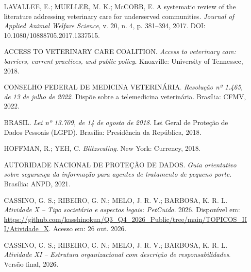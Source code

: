 \begin{enumerate}[label={[\arabic*]},leftmargin=1.1cm,itemsep=0.35em]
\item LAVALLEE, E.; MUELLER, M. K.; McCOBB, E. A systematic review of the literature addressing veterinary care for underserved communities. \textit{Journal of Applied Animal Welfare Science}, v. 20, n. 4, p. 381--394, 2017. DOI: 10.1080/10888705.2017.1337515.
\item ACCESS TO VETERINARY CARE COALITION. \textit{Access to veterinary care: barriers, current practices, and public policy}. Knoxville: University of Tennessee, 2018.
\item CONSELHO FEDERAL DE MEDICINA VETERINÁRIA. \textit{Resolução nº 1.465, de 13 de julho de 2022}. Dispõe sobre a telemedicina veterinária. Brasília: CFMV, 2022.
\item BRASIL. \textit{Lei nº 13.709, de 14 de agosto de 2018}. Lei Geral de Proteção de Dados Pessoais (LGPD). Brasília: Presidência da República, 2018.
\item HOFFMAN, R.; YEH, C. \textit{Blitzscaling}. New York: Currency, 2018.
\item AUTORIDADE NACIONAL DE PROTEÇÃO DE DADOS. \textit{Guia orientativo sobre segurança da informação para agentes de tratamento de pequeno porte}. Brasília: ANPD, 2021.
\item CASSINO, G. S.; RIBEIRO, G. N.; MELO, J. R. V.; BARBOSA, K. R. L. \textit{Atividade X -- Tipo societário e aspectos legais: PetCuida}. 2026. Disponível em: \url{https://github.com/kasshinokun/Q3_Q4_2026_Public/tree/main/TOPICOS_III/Atividade_X}. Acesso em: 26 out. 2026.
\item CASSINO, G. S.; RIBEIRO, G. N.; MELO, J. R. V.; BARBOSA, K. R. L. \textit{Atividade XI -- Estrutura organizacional com descrição de responsabilidades}. Versão final, 2026.
\end{enumerate}
\normalsize\onehalfspacing
